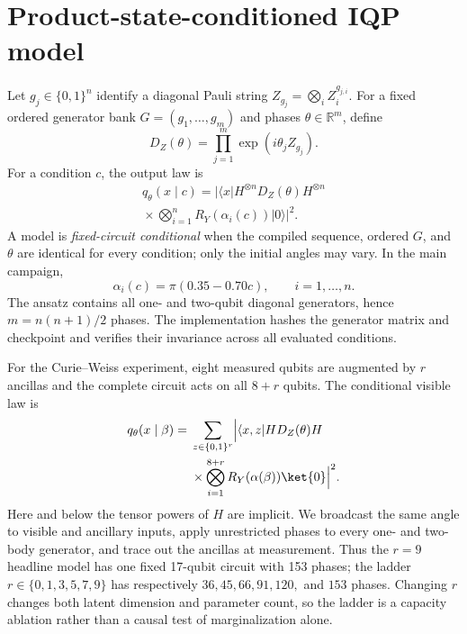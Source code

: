 \documentclass[a4paper,twocolumn,11pt,unpublished]{quantumarticle}
\newcommand{\bits}{\{0,1\}}
\begin{document}
\section{Product-state-conditioned IQP model}
\label{sec:model}

Let $g_j\in\bits^n$ identify a diagonal Pauli string
$Z_{g_j}=\bigotimes_iZ_i^{g_{j,i}}$.  For a fixed ordered generator bank
$G=(g_1,\ldots,g_m)$ and phases $\theta\in\mathbb R^m$, define
\begin{equation}
 D_Z(\theta)=\prod_{j=1}^{m}\exp(i\theta_jZ_{g_j}).
\end{equation}
For a condition $c$, the output law is
\begin{equation}
 \begin{split}
 q_\theta(x\mid c)=\bigg|\langle x|H^{\otimes n}D_Z(\theta)H^{\otimes n}\\
 {}\times\bigotimes_{i=1}^{n}R_Y(\alpha_i(c))|0\rangle\bigg|^2.
 \end{split}
 \label{eq:model}
\end{equation}
A model is \emph{fixed-circuit conditional} when the compiled sequence,
ordered $G$, and $\theta$ are identical for every condition; only the initial
angles may vary.  In the main campaign,
\begin{equation}
 \alpha_i(c)=\pi(0.35-0.70c),\qquad i=1,\ldots,n.
 \label{eq:broadcast}
\end{equation}
The ansatz contains all one- and two-qubit diagonal generators, hence
$m=n(n+1)/2$ phases.  The implementation hashes the generator matrix and
checkpoint and verifies their invariance across all evaluated conditions.

For the Curie--Weiss experiment, eight measured qubits are augmented by
$r$ ancillas and the complete circuit acts on all $8+r$ qubits.  The conditional
visible law is
\begin{equation}
 \begin{split}
 q_\theta(x\mid\beta)={}&\sum_{z\in\bits^r}\Bigl|\langle x,z|
 H D_Z(\theta)H\\
 &{}\times\bigotimes_{i=1}^{8+r}
 R_Y(\alpha(\beta))\ket{0}\Bigr|^2.
 \end{split}
 \label{eq:ancilla-model}
\end{equation}
Here and below the tensor powers of $H$ are implicit.  We broadcast the same
angle to visible and ancillary inputs, apply unrestricted phases to every
one- and two-body generator, and trace out the ancillas at measurement.  Thus
the $r=9$ headline model has one fixed 17-qubit circuit with 153 phases; the
ladder $r\in\{0,1,3,5,7,9\}$ has respectively
$36,45,66,91,120,$ and $153$ phases.  Changing $r$ changes both latent dimension
and parameter count, so the ladder is a capacity ablation rather than a causal
test of marginalization alone.
\end{document}
